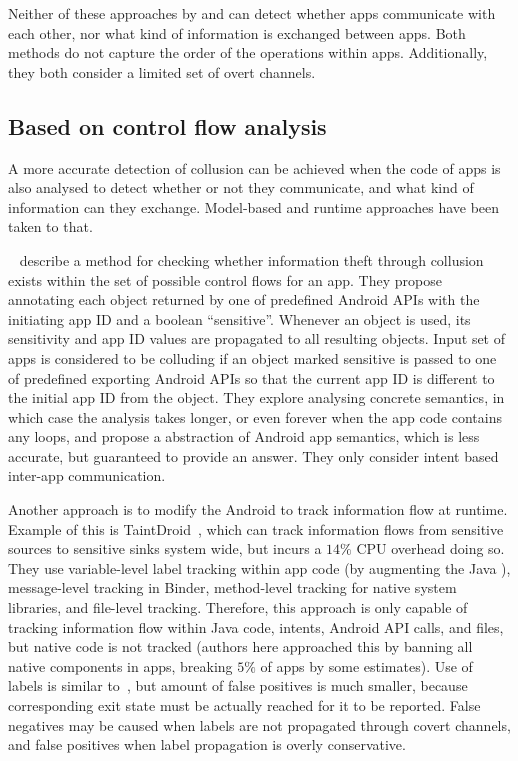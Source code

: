 \documentclass[article, oneside]{aaltoseries}
\renewcommand\gls\cgls \renewcommand\glspl\cglspl
\begin{document}
Neither of these approaches by \citeauthor{Asavoae2016} and
\citeauthor{Chen2018} can detect whether apps communicate
with each other, nor what kind of information is
exchanged between apps. Both methods do not capture the
order of the operations within apps. Additionally, they both
consider a limited set of overt channels.

\subsection{Based on control flow analysis}
\label{sec:flow}

A more accurate detection of collusion can be achieved when
the code of apps is also analysed to detect whether or not
they communicate, and what kind of information can they
exchange. Model-based and runtime approaches have been taken
to that.

\citeauthor{Asavoae2018}~\cite{Asavoae2018} describe a
method for checking whether information theft through
collusion exists within the set of possible control flows
for an app. They propose annotating each object returned by
one of predefined Android APIs with the initiating app ID
and a boolean ``sensitive''. Whenever an object is used, its
sensitivity and app ID values are propagated to all
resulting objects. Input set of apps is considered to be
colluding if an object marked sensitive is passed to one of
predefined exporting Android APIs so that the current app ID
is different to the initial app ID from the object. They
explore analysing concrete semantics, in which case the
analysis takes longer, or even forever when the app code
contains any loops, and propose a abstraction of Android app
semantics, which is less accurate, but guaranteed to provide
an answer. They only consider intent based inter-app
communication.

Another approach is to modify the Android \gls{os} to track
information flow at runtime. Example of this is
TaintDroid~\cite{Enck2014}, which can track information
flows from sensitive sources to sensitive sinks system wide,
but incurs a $14\%$ CPU overhead doing so. They use
variable-level label tracking within app code (by augmenting
the Java \gls{vm}), message-level tracking in Binder,
method-level tracking for native system libraries, and
file-level tracking. Therefore, this approach is only
capable of tracking information flow within Java code,
intents, Android API calls, and files, but native code is
not tracked (authors here approached this by banning all
native components in apps, breaking $5\%$ of apps by some
estimates). Use of labels is similar
to~\cite{Asavoae2018}, but amount of false positives is much
smaller, because corresponding exit state must be actually
reached for it to be reported. False negatives may be caused
when labels are not propagated through covert channels, and
false positives when label propagation is overly
conservative.
\end{document}
